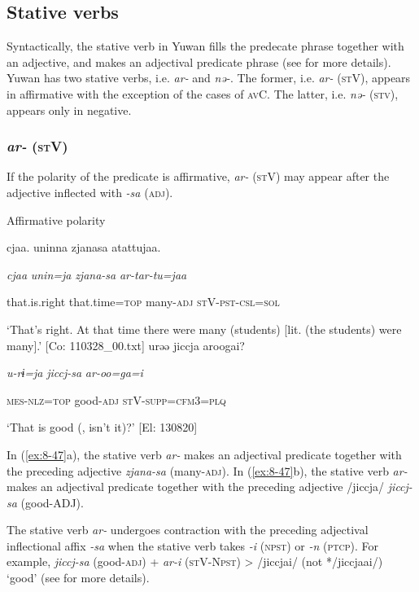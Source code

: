 \subsection{Stative verbs}

Syntactically, the stative verb in Yuwan fills the predecate phrase together with an adjective, and makes an adjectival predicate phrase (see  for more details). Yuwan has two stative verbs, i.e. \textit{ar-} and \textit{nə-}. The former, i.e. \textit{ar-} (\textsc{st}V), appears in affirmative with the exception of the cases of \textsc{av}C. The latter, i.e. \textit{nə-} (\textsc{stv}), appears only in negative.

\subsubsection{\textit{ar-} (\textsc{st}V)}

If the polarity of the predicate is affirmative, \textit{ar-} (\textsc{st}V) may appear after the adjective inflected with \textit{{}-sa} (\textsc{adj}).

\ea\label{ex:8-47}
  Affirmative polarity

\ea {\US}
\glll   cjaa.  uninna  zjanasa  atattujaa.

      \textit{cjaa}  \textit{unin=ja}  \textit{zjana-sa}  \textit{ar{}-tar-tu=jaa}

      that.is.right  that.time=\textsc{top}  many-\textsc{adj}  \textsc{st}V-\textsc{pst}-\textsc{csl}=\textsc{sol}

\glt ‘That’s right. At that time there were many (students) [lit. (the students) were many].’ [Co: 110328\_00.txt]
\ex {\TM}
\glll  urəə  jiccja  aroogai?

      \textit{u-rɨ=ja}  \textit{jiccj-sa}  \textit{ar{}-oo=ga=i}

      \textsc{mes}-\textsc{nlz}=\textsc{top}  good-\textsc{adj}  \textsc{st}V-\textsc{supp}=\textsc{cfm}3=\textsc{plq}

\glt ‘That is good (, isn’t it)?’ [El: 130820]

In (\ref{ex:8-47}a), the stative verb \textit{ar-} makes an adjectival predicate together with the preceding adjective \textit{zjana-sa} (many-\textsc{adj}). In (\ref{ex:8-47}b), the stative verb \textit{ar-} makes an adjectival predicate together with the preceding adjective /jiccja/ \textit{jiccj-sa} (good-ADJ).

  The stative verb \textit{ar-} undergoes contraction with the preceding adjectival inflectional affix \textit{{}-sa} when the stative verb takes \textit{{}-i} (\textsc{npst}) or \textit{{}-n} (\textsc{ptcp}). For example, \textit{jiccj-sa} (good-\textsc{adj}) + \textit{ar-i} (\textsc{st}V-N\textsc{pst}) > /jiccjai/ (not */jiccjaai/) ‘good’ (see  for more details).


